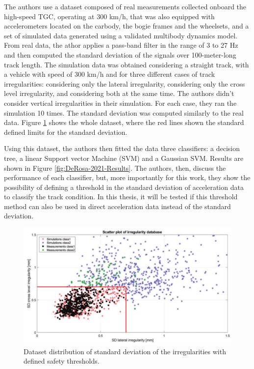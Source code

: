 The authors use a dataset composed of real measurements collected onboard the high-speed TGC, operating at 300 km/h, that was also equipped with accelerometers located on the carbody, the bogie frames and the wheelsets, and a set of simulated data generated using a validated multibody dynamics model. From real data, the athor applies a pass-band filter in the range of 3 to 27 Hz and then computed the standard deviation of the signals over 100-meter-long track length. The simulation data was obtained considering a straight track, with a vehicle with speed of 300 km/h and for three different cases of track irregularities: considering only the lateral irregularity, considering only the cross level irregularity, and considering both at the same time. The authors didn't consider vertical irregularities in their simulation. For each case, they ran the simulation 10 times. The standard deviation was computed similarly to the real data. Figure \ref{fig:DeRosa-dataset} shows the whole dataset, where the red lines shown the standard defined limits for the standard deviation.

Using this dataset, the authors then fitted the data three classifiers: a decision tree, a linear Support vector Machine (SVM) and a Gaussian SVM. Results are shown in Figure \ref{fig:DeRosa-2021-Results}. The authors, then, discuss the performance of each classifier, but, more importantly for this work, they show the possibility of defining a threshold in the standard deviation of acceleration data to classify the track condition. In this thesis, it will be tested if this threshold method can also be used in direct acceleration data instead of the standard deviation.

\begin{figure}[H]
    \centering
    \includegraphics[width=12cm]{Cap2_LitReview/Track_Quality_Accel/DeRosa (2021)/dataset.png}
    \caption{Dataset distribution of standard deviation of the irregularities with defined safety thresholds. \cite{DeRosa2021}}
    \label{fig:DeRosa-dataset}
\end{figure}

